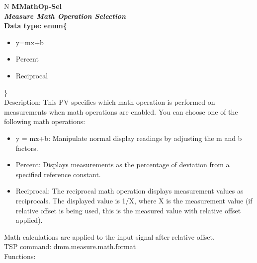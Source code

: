 \documentclass[openany]{article}
\begin{document}
		\begin{tabular}{N}
			\hline
			\bfseries MMathOp-Sel\label{pv:mmathop-sel} \\ \hline
			\emph{Measure Math Operation Selection} \\
			Data type: enum\{\begin{itemize}[noitemsep]
				\small
				\item[] y=mx+b
				\item[] Percent
				\item[] Reciprocal
			\end{itemize}\} \\
			Description: This PV specifies which math operation is performed on measurements when math operations are enabled. You can choose one of the following math operations: \begin{itemize} \item y = mx+b: Manipulate normal display readings by adjusting the m and b factors. \item Percent: Displays measurements as the percentage of deviation from a specified reference constant. \item Reciprocal: The reciprocal math operation displays measurement values as reciprocals. The displayed value is 1/X, where X is the measurement value (if relative offset is being used, this is the measured value with relative offset applied). \end{itemize} Math calculations are applied to the input signal after relative offset.\\
			TSP command: dmm.measure.math.format \\
			Functions: \\
			\arrayrulecolor{\FuncTableBorderColor}

		\end{tabular}
\end{document}
